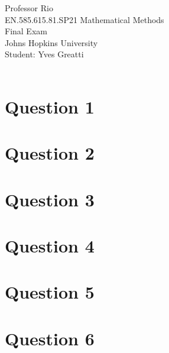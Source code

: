 \documentclass[12pt,twoside]{article}
\begin{document}
\noindent Professor Rio\\
EN.585.615.81.SP21 Mathematical Methods\\
Final Exam\\
Johns Hopkins University\\
Student: Yves Greatti\\\

\section*{Question 1}

\section*{Question 2}

\section*{Question 3}

\section*{Question 4}

\section*{Question 5}

\section*{Question 6}
\end{document}
